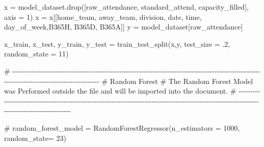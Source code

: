 \documentclass[
  letterpaper,
  DIV=11,
  numbers=noendperiod]{scrartcl}
\newenvironment{Shaded}{\begin{snugshade}}{\end{snugshade}}
\newcommand{\CommentTok}[1]{\textcolor[rgb]{0.37,0.37,0.37}{#1}}
\newcommand{\DecValTok}[1]{\textcolor[rgb]{0.68,0.00,0.00}{#1}}
\newcommand{\FloatTok}[1]{\textcolor[rgb]{0.68,0.00,0.00}{#1}}
\newcommand{\NormalTok}[1]{\textcolor[rgb]{0.00,0.23,0.31}{#1}}
\newcommand{\OperatorTok}[1]{\textcolor[rgb]{0.37,0.37,0.37}{#1}}
\newcommand{\StringTok}[1]{\textcolor[rgb]{0.13,0.47,0.30}{#1}}
\begin{document}
\begin{Shaded}
\begin{Highlighting}[]
\NormalTok{x }\OperatorTok{=}\NormalTok{ model\_dataset.drop([}\StringTok{\textquotesingle{}raw\_attendance\textquotesingle{}}\NormalTok{, }\StringTok{\textquotesingle{}standard\_attend\textquotesingle{}}\NormalTok{, }\StringTok{\textquotesingle{}capacity\_filled\textquotesingle{}}\NormalTok{], axis }\OperatorTok{=} \DecValTok{1}\NormalTok{)}
\NormalTok{x }\OperatorTok{=}\NormalTok{ x[[}\StringTok{\textquotesingle{}home\_team\textquotesingle{}}\NormalTok{, }\StringTok{\textquotesingle{}away\_team\textquotesingle{}}\NormalTok{, }\StringTok{\textquotesingle{}division\textquotesingle{}}\NormalTok{, }\StringTok{\textquotesingle{}date\textquotesingle{}}\NormalTok{, }\StringTok{\textquotesingle{}time\textquotesingle{}}\NormalTok{, }\StringTok{\textquotesingle{}day\_of\_week\textquotesingle{}}\NormalTok{,}\StringTok{\textquotesingle{}B365H\textquotesingle{}}\NormalTok{, }\StringTok{\textquotesingle{}B365D\textquotesingle{}}\NormalTok{,}
       \StringTok{\textquotesingle{}B365A\textquotesingle{}}\NormalTok{]]}
\NormalTok{y }\OperatorTok{=}\NormalTok{ model\_dataset[}\StringTok{\textquotesingle{}raw\_attendance\textquotesingle{}}\NormalTok{]}

\NormalTok{x\_train, x\_test, y\_train, y\_test }\OperatorTok{=}\NormalTok{ train\_test\_split(x,y, test\_size }\OperatorTok{=} \FloatTok{.2}\NormalTok{, random\_state }\OperatorTok{=} \DecValTok{11}\NormalTok{)}


\CommentTok{\# {-}{-}{-}{-}{-}{-}{-}{-}{-}{-}{-}{-}{-}{-}{-}{-}{-}{-}{-}{-}{-}{-}{-}{-}{-}{-}{-}{-}{-}{-}{-}{-}{-}{-}{-}{-}{-}{-}{-}{-}{-}{-}{-}{-}{-}{-}{-}{-}{-}{-}{-}{-}{-}{-}{-}{-}{-}{-}{-}{-}{-}{-}{-}{-}{-}{-}{-}{-}{-}{-}{-}{-}{-}{-}{-}{-}{-}{-}{-}{-}{-}{-}{-}{-}{-}{-}{-}{-}{-}{-}{-}{-}{-}{-}{-}{-}{-}{-}{-}{-}{-}{-}{-}{-}{-}{-}{-}{-}{-}{-}{-}{-}{-}{-}{-}{-}{-}{-}{-}{-}{-}{-}{-}{-}{-}{-}{-}{-}{-}{-}{-}{-}{-}{-}{-}{-}{-}{-}{-}{-}{-}{-}{-}{-}}
\CommentTok{\# Random Forest}
\CommentTok{\# The Random Forest Model was Performed outside the file and will be imported into the document. }
\CommentTok{\#  {-}{-}{-}{-}{-}{-}{-}{-}{-}{-}{-}{-}{-}{-}{-}{-}{-}{-}{-}{-}{-}{-}{-}{-}{-}{-}{-}{-}{-}{-}{-}{-}{-}{-}{-}{-}{-}{-}{-}{-}{-}{-}{-}{-}{-}{-}{-}{-}{-}{-}{-}{-}{-}{-}{-}{-}{-}{-}{-}{-}{-}{-}{-}{-}{-}{-}{-}{-}{-}{-}{-}{-}{-}{-}{-}{-}{-}{-}{-}{-}{-}{-}{-}{-}{-}{-}{-}{-}{-}{-}{-}{-}{-}{-}{-}{-}{-}{-}{-}{-}{-}{-}{-}{-}{-}{-}{-}{-}{-}{-}{-}{-}{-}{-}{-}{-}{-}{-}{-}{-}{-}{-}{-}{-}{-}{-}{-}{-}{-}{-}{-}{-}{-}{-}{-}{-}{-}{-}{-}{-}{-}{-}{-}{-}}

\CommentTok{\# random\_forest\_model = RandomForestRegressor(n\_estimators = 1000, random\_state= 23)}


\end{Highlighting}
\end{Shaded}
\end{document}

